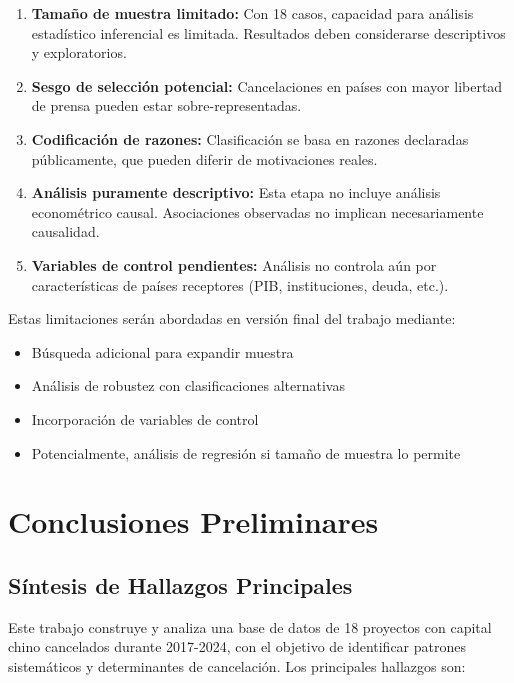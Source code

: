 \documentclass[12pt]{article}
\begin{document}
\begin{enumerate}
    \item \textbf{Tamaño de muestra limitado:} Con 18 casos, capacidad para análisis estadístico inferencial es limitada. Resultados deben considerarse descriptivos y exploratorios.
    
    \item \textbf{Sesgo de selección potencial:} Cancelaciones en países con mayor libertad de prensa pueden estar sobre-representadas.
    
    \item \textbf{Codificación de razones:} Clasificación se basa en razones declaradas públicamente, que pueden diferir de motivaciones reales.
    
    \item \textbf{Análisis puramente descriptivo:} Esta etapa no incluye análisis econométrico causal. Asociaciones observadas no implican necesariamente causalidad.
    
    \item \textbf{Variables de control pendientes:} Análisis no controla aún por características de países receptores (PIB, instituciones, deuda, etc.).
\end{enumerate}

Estas limitaciones serán abordadas en versión final del trabajo mediante:
\begin{itemize}
    \item Búsqueda adicional para expandir muestra
    \item Análisis de robustez con clasificaciones alternativas
    \item Incorporación de variables de control
    \item Potencialmente, análisis de regresión si tamaño de muestra lo permite
\end{itemize}

\section{Conclusiones Preliminares}

\subsection{Síntesis de Hallazgos Principales}

Este trabajo construye y analiza una base de datos de 18 proyectos con capital chino cancelados durante 2017-2024, con el objetivo de identificar patrones sistemáticos y determinantes de cancelación. Los principales hallazgos son:
\end{document}
